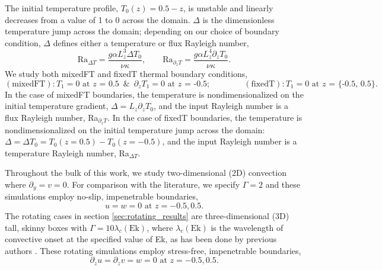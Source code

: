 \documentclass[aps, pre, onecolumn, nofootinbib, notitlepage, groupedaddress, amsfonts, amssymb, amsmath, longbibliography, superscriptaddress]{revtex4-1}
\begin{document}
The initial temperature profile, $T_0(z) = 0.5 - z$, is unstable and linearly decreases from a value of 1 to 0 across the domain. 
$\Delta$ is the dimensionless temperature jump across the domain; depending on our choice of boundary condition, $\Delta$ defines either a temperature or flux Rayleigh number,
\begin{equation}
\text{Ra}_{\Delta T} = \frac{g \alpha L_z^3 \Delta T_0}{\nu\kappa}, \qquad 
\text{Ra}_{\partial_z T} = \frac{g \alpha L_z^4 \partial_z T_0}{\nu\kappa}.
\end{equation}
We study both mixedFT and fixedT thermal boundary conditions,
\begin{equation}
(\text{mixedFT}): T_1 = 0 \text{ at $z$ = 0.5} \,\,\,\&\,\,\, \partial_z T_1 = 0 \text{ at $z$ = -0.5};\qquad\qquad
(\text{fixedT}): T_1 = 0 \text{ at $z$ = \{-0.5, 0.5\}}.
\end{equation}
In the case of mixedFT boundaries, the temperature is nondimensionalized on the initial temperature gradient, $\Delta = L_z \partial_z T_0$, and the input Rayleigh number is a flux Rayleigh number, Ra$_{\partial_z T}$.
In the case of fixedT boundaries, the temperature is nondimensionalized on the initial temperature jump across the domain: $\Delta = \Delta T_0 =  T_0(z=0.5)-T_0(z=-0.5)$, and the input Rayleigh number is a temperature Rayleigh number, Ra$_{\Delta T}$.



Throughout the bulk of this work, we study two-dimensional (2D) convection where $\partial_y = v = 0$.
For comparison with the literature, we specify $\Gamma = 2$ and these simulations employ no-slip, impenetrable boundaries,
\begin{equation}
u = w = 0 \, \, \text{at}\,\,z = -0.5, 0.5.
\label{eqn:vel_bcs}
\end{equation}
The rotating cases in section \ref{sec:rotating_results} are three-dimensional (3D) tall, skinny boxes with $\Gamma = 10\lambda_c(\text{Ek})$, where $\lambda_c(\text{Ek})$ is the wavelength of convective onset at the specified value of Ek, as has been done by previous authors \cite{stellmach&all2014}. 
These rotating simulations employ stress-free, impenetrable boundaries,
\begin{equation}
\partial_z u = \partial_z v = w = 0 \, \, \text{at}\,\,z = -0.5, 0.5.
\label{eqn:vel_bcs}
\end{equation}
\end{document}
